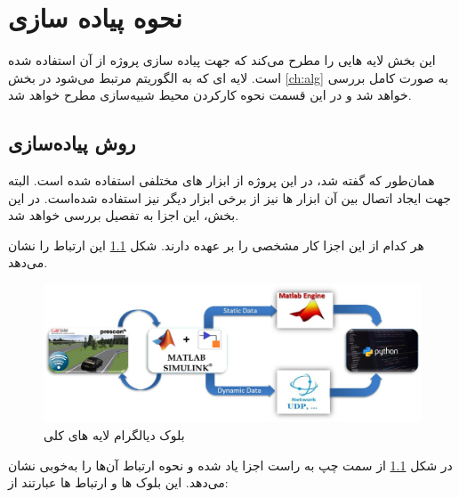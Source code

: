 \chapter{ نحوه پیاده سازی}\label{ch:fani}

این بخش لایه هایی را مطرح می‌کند که جهت پیاده سازی پروژه از آن استفاده شده است. لایه ای که به الگوریتم مرتبط می‌شود در بخش \ref{ch:alg} به صورت کامل بررسی خواهد شد و در این قسمت نحوه کارکردن محیط شبیه‌سازی مطرح خواهد شد.




\section{روش پیاده‌سازی}
همان‌طور که گفته شد، در این پروژه از ابزار های مختلفی استفاده شده است. البته جهت ایجاد اتصال بین آن ابزار ها نیز از برخی ابزار دیگر نیز استفاده شده‌است. در این بخش، این اجزا به تفصیل بررسی خواهد شد.

هر کدام از این اجزا کار مشخصی را بر عهده دارند.
شکل  
\ref{fig:block-diagram}
این ارتباط را نشان می‌دهد.

\begin{figure}[h!]
	\centering
	\includegraphics[width=1\linewidth]{Figures/block-diagram-white}
	\caption{بلوک دیالگرام لایه های کلی}
	\label{fig:block-diagram}
\end{figure}

در شکل 
\ref{fig:block-diagram}
از سمت چپ به راست اجزا یاد شده و نحوه ارتباط آن‌ها را به‌خوبی نشان می‌دهد. این بلوک ها و ارتباط ها عبارتند از:


